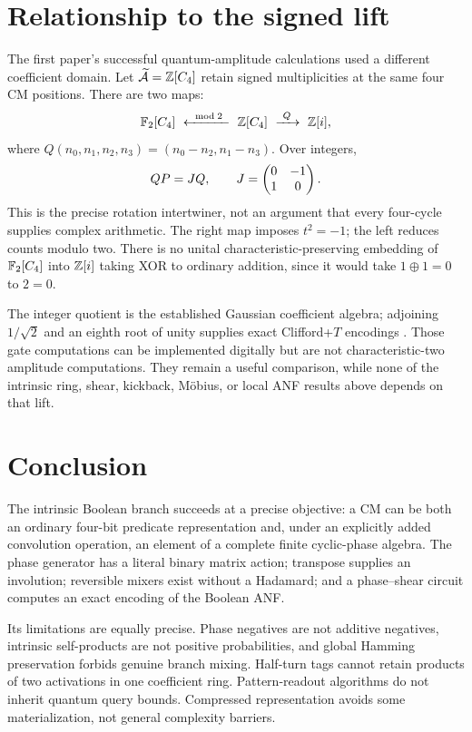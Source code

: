 \section{Relationship to the signed lift}\label{sec:lift}
The first paper's successful quantum-amplitude calculations used a different coefficient domain. Let $\widetilde{\mathcal A}=\mathbb Z[C_4]$ retain signed multiplicities at the same four CM positions. There are two maps:
\begin{equation}\label{eq:span}
 \mathbb F_2[C_4]\ \xleftarrow{\ \bmod2\ }\ \mathbb Z[C_4]
 \ \xrightarrow{\ Q\ }\ \mathbb Z[i],
\end{equation}
where $Q(n_0,n_1,n_2,n_3)=(n_0-n_2,n_1-n_3)$. Over integers,
\begin{equation}
 QP=JQ,\qquad J=\begin{pmatrix}0&-1\\1&0\end{pmatrix}.
\end{equation}
This is the precise rotation intertwiner, not an argument that every four-cycle supplies complex arithmetic. The right map imposes $t^2=-1$; the left reduces counts modulo two. There is no unital characteristic-preserving embedding of $\mathbb F_2[C_4]$ into $\mathbb Z[i]$ taking XOR to ordinary addition, since it would take $1\oplus1=0$ to $2=0$.

The integer quotient is the established Gaussian coefficient algebra; adjoining $1/\sqrt2$ and an eighth root of unity supplies exact Clifford+$T$ encodings \cite{giles}. Those gate computations can be implemented digitally but are not characteristic-two amplitude computations. They remain a useful comparison, while none of the intrinsic ring, shear, kickback, M\"obius, or local ANF results above depends on that lift.

\section{Conclusion}
The intrinsic Boolean branch succeeds at a precise objective: a CM can be both an ordinary four-bit predicate representation and, under an explicitly added convolution operation, an element of a complete finite cyclic-phase algebra. The phase generator has a literal binary matrix action; transpose supplies an involution; reversible mixers exist without a Hadamard; and a phase--shear circuit computes an exact encoding of the Boolean ANF.

Its limitations are equally precise. Phase negatives are not additive negatives, intrinsic self-products are not positive probabilities, and global Hamming preservation forbids genuine branch mixing. Half-turn tags cannot retain products of two activations in one coefficient ring. Pattern-readout algorithms do not inherit quantum query bounds. Compressed representation avoids some materialization, not general complexity barriers.


